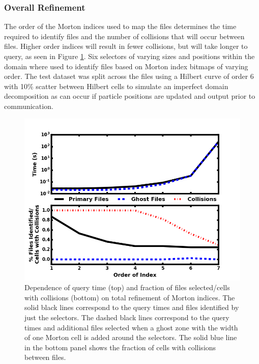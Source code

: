 \documentclass[apjl]{emulateapj}
\begin{document}
\subsubsection{Overall Refinement}\label{SSS:test_order1}
The order of the Morton indices used to map the files determines the time required to identify files and the number of collisions that will occur between files. Higher order indices will result in fewer collisions, but will take longer to query, as seen in Figure \ref{fig:test_order1}. Six selectors of varying sizes and positions within the domain where used to identify files based on Morton index bitmaps of varying order. The test dataset was split across the files using a Hilbert curve of order 6 with 10\% scatter between Hilbert cells to simulate an imperfect domain decomposition as can occur if particle positions are updated and output prior to communication.
%
\begin{figure}[htbp]
\begin{center}
\includegraphics[width=\columnwidth,keepaspectratio]{../images/vary_order1_np1024_nf512_or0.png}
\caption{Dependence of query time (top) and fraction of files selected/cells with collisions (bottom) on total refinement of Morton indices. The solid black lines correspond to the query times and files identified by just the selectors. The dashed black lines correspond to the query times and additional files selected when a ghost zone with the width of one Morton cell is added around the selectors. The solid blue line in the bottom panel shows the fraction of cells with collisions between files.}
\label{fig:test_order1}
\end{center}
\end{figure}
%
\end{document}
